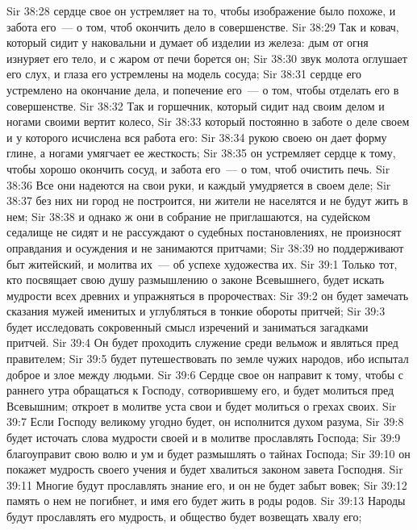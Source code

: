 \vs Sir 38:28 сердце свое он устремляет на то, чтобы изображение было похоже, и забота его~--- о том, чтоб окончить дело в совершенстве.
\vs Sir 38:29 Так и ковач, который сидит у наковальни и думает об изделии из железа: дым от огня изнуряет его тело, и с жаром от печи борется он;
\vs Sir 38:30 звук молота оглушает его слух, и глаза его устремлены на модель сосуда;
\vs Sir 38:31 сердце его устремлено на окончание дела, и попечение его~--- о том, чтобы отделать его в совершенстве.
\vs Sir 38:32 Так и горшечник, который сидит над своим делом и ногами своими вертит колесо,
\vs Sir 38:33 который постоянно в заботе о деле своем и у которого исчислена вся работа его:
\vs Sir 38:34 рукою своею он дает форму глине, а ногами умягчает ее жесткость;
\vs Sir 38:35 он устремляет сердце к тому, чтобы хорошо окончить сосуд, и забота его~--- о том, чтоб очистить печь.
\vs Sir 38:36 Все они надеются на свои руки, и каждый умудряется в своем деле;
\vs Sir 38:37 без них ни город не построится, ни жители не населятся и не будут жить в нем;
\vs Sir 38:38 и однако ж они в собрание не приглашаются, на судейском седалище не сидят и не рассуждают о судебных постановлениях, не произносят оправдания и осуждения и не занимаются притчами;
\vs Sir 38:39 но поддерживают быт житейский, и молитва их~--- об успехе художества их.
\vs Sir 39:1 Только тот, кто посвящает свою душу размышлению о законе Всевышнего, будет искать мудрости всех древних и упражняться в пророчествах:
\vs Sir 39:2 он будет замечать сказания мужей именитых и углубляться в тонкие обороты притчей;
\vs Sir 39:3 будет исследовать сокровенный смысл изречений и заниматься загадками притчей.
\vs Sir 39:4 Он будет проходить служение среди вельмож и являться пред правителем;
\vs Sir 39:5 будет путешествовать по земле чужих народов, ибо испытал доброе и злое между людьми.
\vs Sir 39:6 Сердце свое он направит к тому, чтобы с раннего утра обращаться к Господу, сотворившему его, и будет молиться пред Всевышним; откроет в молитве уста свои и будет молиться о грехах своих.
\vs Sir 39:7 Если Господу великому угодно будет, он исполнится духом разума,
\vs Sir 39:8 будет источать слова мудрости своей и в молитве прославлять Господа;
\vs Sir 39:9 благоуправит свою волю и ум и будет размышлять о тайнах Господа;
\vs Sir 39:10 он покажет мудрость своего учения и будет хвалиться законом завета Господня.
\vs Sir 39:11 Многие будут прославлять знание его, и он не будет забыт вовек;
\vs Sir 39:12 память о нем не погибнет, и имя его будет жить в роды родов.
\vs Sir 39:13 Народы будут прославлять его мудрость, и общество будет возвещать хвалу его;
